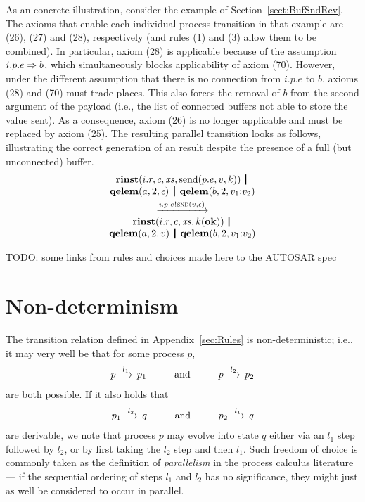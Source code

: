 \documentclass[twocolumn]{article}
\begin{document}
As an concrete illustration, consider the example of Section~\ref{sect:BufSndRcv}. The axioms that enable each individual process transition in that example are (26), (27) and (28), respectively (and rules (1) and (3) allow them to be combined). In particular, axiom (28) is applicable because of the assumption $i.p.e \Rightarrow b$, which simultaneously blocks applicability of axiom (70). However, under the different assumption that there is no connection from ${i.p.e}$ to $b$, axioms (28) and (70) must trade places. This also forces the removal of $b$ from the second argument of the  payload (i.e., the list of connected buffers not able to store the value sent). As a consequence, axiom (26) is no longer applicable and must be replaced by axiom (25). The resulting parallel transition looks as follows, illustrating the correct generation of an  result despite the presence of a full (but unconnected) buffer.
$$
\begin{array}{c}
  \Trinst {i.r} c \Xs {\TrteSend {p.e} v k} \,\Opar  \\
  {\Tqelem a 2 \Teps} \Opar {\Tqelem b 2 {\Tcons {v_1} {v_2}}} \vspace{0.6ex} \\
  \red{\say{i.p.e}{\Tsnd v \Teps}} \\
  \Trinst {i.r} c \Xs {\Tap k \Tok} \,\Opar \\
  {\Tqelem a 2 v} \Opar {\Tqelem b 2 {\Tcons {v_1} {v_2}}}
\end{array}
$$



TODO: some links from rules and choices made here to the AUTOSAR spec

\section{Non-determinism}
\label{sec:NonDet}

The transition relation defined in Appendix~\ref{sec:Rules} is non-deterministic; i.e., it may very well be that for some process $p$,
$$
\begin{array}{c}
	p \red{l_1} p_1 \hspace{10mm}\text{and}\hspace{10mm} p \red{l_2} p_2
\end{array}
$$
are both possible. If it also holds that
$$
\begin{array}{c}
	p_1 \red{l_2} q \hspace{10mm}\text{and}\hspace{10mm} p_2 \red{l_1} q
\end{array}
$$
are derivable, we note that process $p$ may evolve into state $q$ either via an $l_1$ step followed by $l_2$, or by first taking the $l_2$ step and then $l_1$. Such freedom of choice is commonly taken as the definition of \emph{parallelism} in the process calculus literature --- if the sequential ordering of steps $l_1$ and $l_2$ has no significance, they might just as well be considered to occur in parallel.
\end{document}
